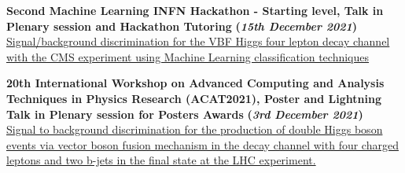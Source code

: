 \documentclass[11pt]{res}
\begin{document}
\begin{resume}
											
\textbf{Second Machine Learning INFN Hackathon - Starting level, Talk in Plenary session and Hackathon Tutoring} \textbf{(\textit{15th December 2021})}\\ 
\href{https://agenda.infn.it/event/28565/contributions/148551/}{Signal/background discrimination for the VBF Higgs four lepton decay channel with the CMS experiment using Machine Learning classification techniques}

\textbf{{20th International Workshop on Advanced Computing and Analysis Techniques in Physics Research (ACAT2021), Poster and Lightning Talk in Plenary session for Posters Awards} } \textbf{(\textit{3rd December 2021})}\\ 
\href{https://indico.cern.ch/event/855454/contributions/4596351/}{Signal to background discrimination for the production of double Higgs boson events via vector boson fusion mechanism in the decay channel with four charged leptons and two b-jets in the final state at the LHC experiment.}





\end{resume}
\end{document}
